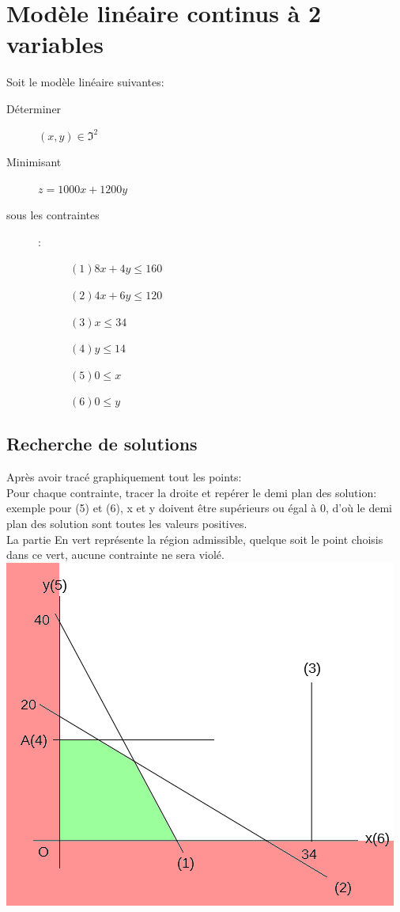 \section{Modèle linéaire continus à 2 variables}
Soit le modèle linéaire suivantes:
\begin{description}
\item[Déterminer] $(x,y) \in \Im^2$
\item[Minimisant] $z = 1000x + 1200y$
\item[sous les contraintes]:
\begin{description}
\item[] $(1) 8x + 4y \leq 160$
\item[] $(2) 4x + 6y \leq 120$
\item[] $(3) x \leq 34$
\item[] $(4) y \leq 14$
\item[] $(5) 0 \leq x$
\item[] $(6) 0 \leq y$
\end{description}
\end{description}

\subsection{Recherche de solutions}
Après avoir tracé graphiquement tout les points:\\
Pour chaque contrainte, tracer la droite et repérer le demi plan des solution: exemple pour (5) et (6), x et y doivent être supérieurs ou égal à 0, d'où le demi plan des solution sont toutes les valeurs positives.\\
La partie En vert représente la région admissible, quelque soit le point choisis dans ce vert, aucune contrainte ne sera violé.\\
\includegraphics[scale=0.55]{img/ro-pl-2var_0.png} 
